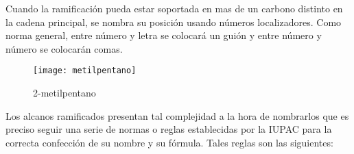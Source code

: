 \begin{figure}[h!]
	\centering
	\hspace{1cm}
\end{figure}

Cuando la ramificación pueda estar soportada en mas de un carbono distinto en la cadena principal, se nombra su posición usando números localizadores. Como norma general, entre número y letra se colocará un guión y entre número y número se colocarán comas.

\begin{figure}[h!]
	\centering
	\texttt{[image: metilpentano]}
	\captionsetup{labelformat=empty}
	\caption{2-metilpentano}
\end{figure}

Los alcanos ramificados presentan tal complejidad a la hora de nombrarlos que es preciso  seguir una serie de normas o reglas establecidas por la IUPAC para la correcta confección de su nombre y su fórmula. Tales reglas son las siguientes:\\

